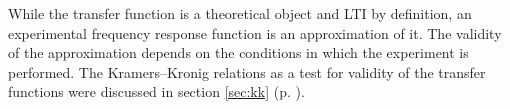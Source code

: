 While the transfer function is a theoretical object and LTI by definition, an experimental frequency response function is an approximation of it. 
The validity of the approximation depends on the conditions in which the experiment is performed.
The Kramers--Kronig relations as a test for validity of the transfer functions were discussed in section \ref{sec:kk} (p. \pageref{sec:kk}).





